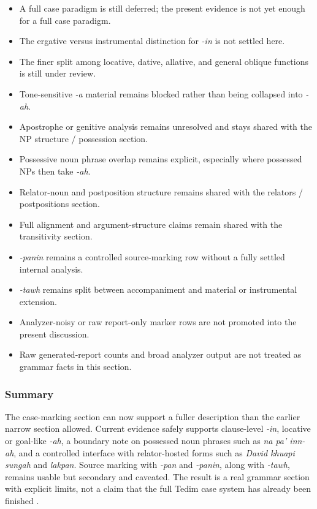 \documentclass[
  11pt,
  a4paper,
]{article}
\providecommand{\tightlist}{%
  \setlength{\itemsep}{0pt}\setlength{\parskip}{0pt}}
\newcommand{\tdim}[1]{\textit{#1}}
\begin{document}
\begin{itemize}
\tightlist
\item
  A full case paradigm is still deferred; the present evidence is not
  yet enough for a full case paradigm.
\item
  The ergative versus instrumental distinction for \tdim{-in} is not
  settled here.
\item
  The finer split among locative, dative, allative, and general oblique
  functions is still under review.
\item
  Tone-sensitive \tdim{-a} material remains blocked rather than being
  collapsed into \tdim{-ah}.
\item
  Apostrophe or genitive analysis remains unresolved and stays shared
  with the NP structure / possession section.
\item
  Possessive noun phrase overlap remains explicit, especially where
  possessed NPs then take \tdim{-ah}.
\item
  Relator-noun and postposition structure remains shared with the
  relators / postpositions section.
\item
  Full alignment and argument-structure claims remain shared with the
  transitivity section.
\item
  \tdim{-panin} remains a controlled source-marking row without a fully
  settled internal analysis.
\item
  \tdim{-tawh} remains split between accompaniment and material or
  instrumental extension.
\item
  Analyzer-noisy or raw report-only marker rows are not promoted into
  the present discussion.
\item
  Raw generated-report counts and broad analyzer output are not treated
  as grammar facts in this section.
\end{itemize}

\subsubsection{Summary}\label{summary}

The case-marking section can now support a fuller description than the
earlier narrow section allowed. Current evidence safely supports
clause-level \tdim{-in}, locative or goal-like \tdim{-ah}, a boundary
note on possessed noun phrases such as \tdim{na pa' inn-ah}, and a
controlled interface with relator-hosted forms such as
\tdim{David khuapi sungah} and \tdim{lakpan}. Source marking with
\tdim{-pan} and \tdim{-panin}, along with \tdim{-tawh}, remains usable
but secondary and caveated. The result is a real grammar section with
explicit limits, not a claim that the full Tedim case system has already
been finished \citep{henderson1965, zamngaihcing2017}.
\end{document}
